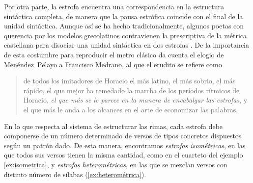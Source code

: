 Por otra parte, la estrofa encuentra una correspondencia en la estructura sintáctica completa, de manera que la pausa estrófica coincide con el final de la unidad sintáctica. Aunque así se ha hecho tradicionalmente, algunos poetas con querencia por los modelos grecolatinos contravienen la prescriptiva de la métrica castellana para disociar una unidad sintáctica en dos estrofas \parencite[97]{quilis2013}. De la importancia de esta costumbre para reproducir el metro clásico da cuenta el elogio de Menéndez~Pelayo a Francisco Medrano, al que el erudito se refiere como \blockquote{de todos los imitadores de Horacio el más latino, el más sobrio, el más rápido, el que mejor ha remedado la marcha de los períodos rítmicos de Horacio, \textit{el que más se le parece en la manera de encabalgar las estrofas}, y el que más le anda a los alcances en el arte de economizar las palabras. \parencite[p. 14; énfasis añadido]{menendezpelayo1951}}.

En lo que respecta al sistema de estructurar las rimas, cada estrofa debe componerse de un número determinado de versos de tipos concretos dispuestos según un patrón dado. De esta manera, encontramos \textit{estrofas isométricas}, en las que todos sus versos tienen la misma cantidad, como en el cuarteto del ejemplo \ref{ex:isometrica}, y \textit{estrofas heterométricas}, en las que se mezclan versos con distinto número de sílabas (\ref{ex:heterométrica}).

